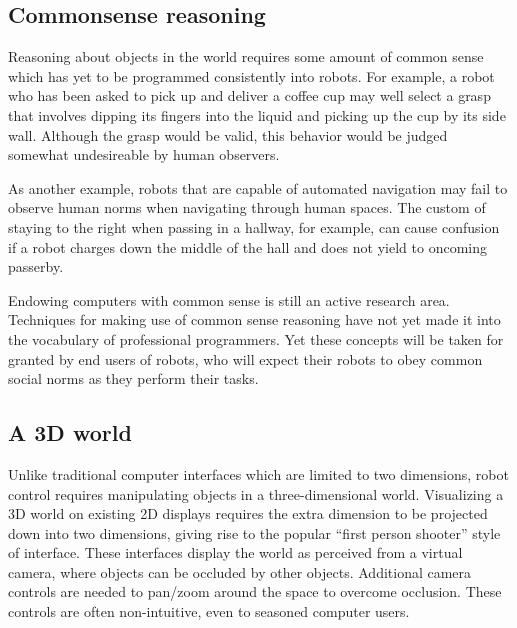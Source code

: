 \documentclass[10pt,twocolumn]{article}
\begin{document}

\begin{changebar}
\subsection{Commonsense reasoning}

Reasoning about objects in the world requires some amount of common sense which has yet to be programmed consistently into robots. For example, a robot who has been asked to pick up and deliver a coffee cup may well select a grasp that involves dipping its fingers into the liquid and picking up the cup by its side wall. Although the grasp would be valid, this behavior would be judged somewhat undesireable by human observers.

As another example, robots that are capable of automated navigation may fail to observe human norms when navigating through human spaces. The custom of staying to the right when passing in a hallway, for example, can cause confusion if a robot charges down the middle of the hall and does not yield to oncoming passerby.

Endowing computers with common sense is still an active research area. Techniques for making use of common sense reasoning have not yet made it into the vocabulary of professional programmers. Yet these concepts will be taken for granted by end users of robots, who will expect their robots to obey common social norms as they perform their tasks.
\end{changebar}

\subsection{A 3D world}


Unlike traditional computer interfaces which are limited to two dimensions, robot control requires manipulating objects in a three-dimensional world. Visualizing a 3D world on existing 2D displays requires the extra dimension to be projected down into two dimensions, giving rise to the popular ``first person shooter'' style of interface. These interfaces display the world as perceived from a virtual camera, where objects can be occluded by other objects. Additional camera controls are needed to pan/zoom around the space to overcome occlusion. These controls are often non-intuitive, even to seasoned computer users.
\end{document}
